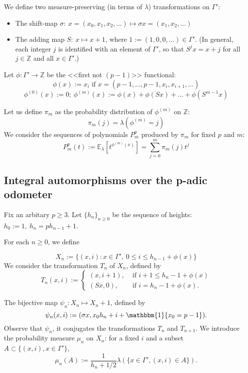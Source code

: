 \documentclass[a4paper]{article}
\theoremstyle{plain}
\theoremstyle{definition}
\begin{document}
    We define two measure-preserving (in terms of $\lambda$) transformations on $\Gamma'$:
    \begin{itemize}
    \item The shift-map $\sigma:\ x=\left(x_0, x_1, x_2, \ldots \right) \mapsto \sigma x = \left(x_1, x_2, \ldots \right)$
    \item The adding map $S:\ x \mapsto x + 1$, where $1:=(1,0,0,\ldots) \in \Gamma'$. (In general, each integer $j$ is
identified with an element of $\Gamma'$, so that $S^jx = x + j$ for all $j \in \mathbb{Z}$ and all
$x \in \Gamma'$.)
    \end{itemize}
    Let $\phi: \Gamma' \rightarrow \mathbb{Z}$ be the <<first not $(p-1)$>> functional:\\
    \[\phi(x):=x_i\text{ if }x=(p-1, \ldots, p-1, x_i, x_{i+1}, \ldots)\]
    \[\phi^{(0)}(x):=0;\ \phi^{(m)}(x):=\phi(x)+\phi(Sx)+\ldots+\phi(S^{m-1}x)\]

Let us define $\pi_m$ as the probability distribution of $\phi^{(m)}$ on $\mathbb{Z}$:
    \[\pi_m(j) = \lambda(\phi^{(m)}=j)\]
    We consider the sequences of polynomials $P_m^p$ produced by $\pi_m$ for fixed $p$ and $m$:
    \[P_m^p(t):= \mathbb{E}_\lambda\left[ t^{\phi^{(m)}(x)}\right] = \sum\limits_{j=0}^m \pi_m(j) t^j \]
    
\subsection{Integral automorphisms over the p-adic odometer}
Fix an arbitary $p \ge 3$. Let $\{h_n\}_{n \ge 0}$ be the sequence of heights: $h_0 := 1,\ h_n = ph_{n-1}+1$.

For each $n \ge 0$, we define

$$X_n:=\{(x,i): x \in \Gamma',\ 0 \le i \le h_{n-1} + \phi(x)\}$$
We consider the transformation $T_n$ of $X_n$, defined by
$$T_n(x, i) := \begin{cases}
(x,i+1), & \text{ if } i+1 \le h_n - 1 + \phi(x) \\
(Sx,0), & \text{ if } i=h_n-1+\phi(x). \end{cases}$$

The bijective map $\psi_n : X_n \mapsto X_n+1$, defined by
$$\psi_n(x,i):=(\sigma x, x_0 h_n + i + \mathbbm{1}\{x_0=p-1\}).$$
Observe that $\psi_n$, it conjugates the transformations $T_n$ and
$T_{n+1}$. We introduce the probability measure $\mu_n$ on $X_n$: for a fixed $i$ and a subset
$A \subset \{(x, i), x\in\Gamma' \}$,
$$\mu_n(A):=\frac{1}{h_n + 1/2} \lambda (\{x \in \Gamma', (x, i) \in A\}).$$
\end{document}
